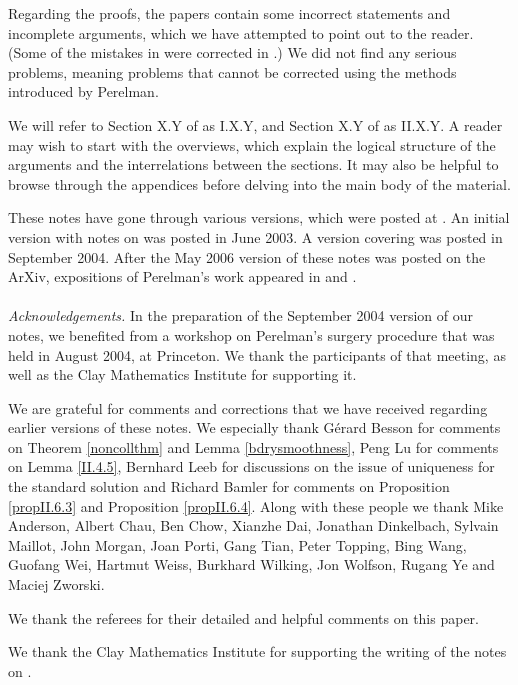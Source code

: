 Regarding the proofs, the papers \cite{Perelman,Perelman2}  contain some incorrect statements
and incomplete arguments, which we have attempted to point out to the reader.
(Some of the mistakes in \cite{Perelman} were corrected in \cite{Perelman2}.)
We did not find any
serious problems, meaning problems that cannot be corrected using the methods
introduced by Perelman.

We will refer to Section X.Y of \cite{Perelman} as I.X.Y, and
Section X.Y of \cite{Perelman2} as II.X.Y.
A reader may wish to start with the overviews, which
explain the logical structure of the arguments and the
interrelations between the sections.
It may also be helpful to browse through the appendices before delving into the
main body of the material.


These notes have gone through various versions, which were
posted at \cite{KleinerLottwebsite}.
An initial version with notes on \cite{Perelman}
was posted in June 2003.
A version covering \cite{Perelman,Perelman2} was posted in September
2004.
After the May 2006 version of these notes
 was  posted on the ArXiv, expositions of Perelman's
work appeared in
\cite{Cao-Zhu} and \cite{Morgan-Tian}.
 \\ \\
\noindent
{\em Acknowledgements.}
In the preparation of the September 2004 version of our notes,
we benefited from a
workshop on Perelman's surgery procedure
that was held in August 2004, at Princeton.
We thank the participants of that meeting, as well as
the Clay Mathematics Institute for supporting it.

We are grateful for comments and corrections that we have
received regarding earlier versions of these
notes.
We especially thank G\'erard Besson for comments on Theorem
\ref{noncollthm} and Lemma \ref{bdrysmoothness}, Peng Lu for
comments on Lemma \ref{II.4.5}, Bernhard Leeb for
discussions on the issue of uniqueness for the standard
solution and Richard Bamler for comments on
Proposition \ref{propII.6.3} and Proposition \ref{propII.6.4}.
Along with these people we thank
Mike Anderson, Albert Chau,
Ben Chow, Xianzhe Dai, Jonathan Dinkelbach,
Sylvain Maillot, John Morgan,
Joan Porti, Gang Tian, Peter Topping, Bing Wang,
Guofang Wei, Hartmut Weiss,
Burkhard Wilking, Jon Wolfson, Rugang Ye and Maciej Zworski.


We thank the referees for their detailed and helpful comments on
this paper.


We thank the Clay Mathematics Institute for supporting the writing
of the notes on \cite{Perelman2}.



